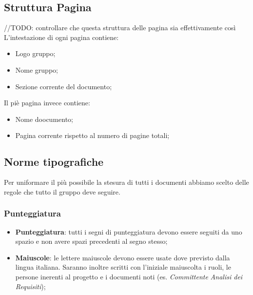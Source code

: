 \subsection{Struttura Pagina}
	//TODO: controllare che questa struttura delle pagina sia effettivamente così
L'intestazione di ogni pagina contiene:
\begin{itemize}
\item Logo gruppo;
\item Nome gruppo;
\item Sezione corrente del documento;
\end{itemize}
Il piè pagina invece contiene:
\begin{itemize}
\item Nome doocumento;
\item Pagina corrente rispetto al numero di pagine totali;
\end{itemize}


\subsection{Norme tipografiche}
Per uniformare il più possibile la stesura di tutti i documenti abbiamo scelto delle regole che tutto il gruppo deve seguire.

\subsubsection{Punteggiatura}
\begin{itemize}
\item \textbf{Punteggiatura}: tutti i segni di punteggiatura devono essere seguiti da uno spazio e non avere spazi precedenti al segno stesso;
\item \textbf{Maiuscole}: le lettere maiuscole devono essere usate dove previsto dalla lingua italiana.
Saranno inoltre scritti con l'iniziale maiuscolta i ruoli, le persone inerenti al progetto e i documenti noti (es. \textit{Committente} \textit{Analisi dei Requisiti});
\end{itemize}

